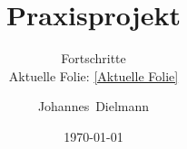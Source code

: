\usepackage{mathptmx}
\usepackage[T1]{fontenc}
\usepackage[utf8]{inputenc}
\usepackage{babel}
\usepackage{amsmath}
\usepackage{amssymb}
\usepackage{graphicx}

\title{Praxisprojekt}
\subtitle{Fortschritte \\
	Aktuelle Folie: \ref{Aktuelle Folie}}
\author[J.~Dielmann]{Johannes~Dielmann}
\date{\today}
\subject{Praxisprojekt}
